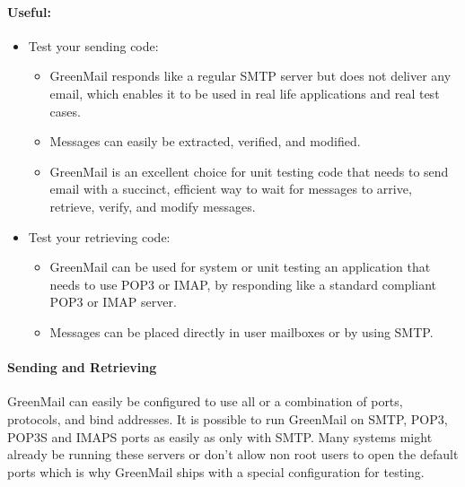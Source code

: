 \paragraph{Useful:}
\begin{itemize}
\item{}Test your sending code: 
\begin{itemize}
\item{}GreenMail responds like a regular SMTP server but does not deliver any email, which enables it to be used in real life applications and real test cases. 
\item{}Messages can easily be extracted, verified, and modified. 
\item{}GreenMail is an excellent choice for unit testing code that needs to send email with a succinct, efficient way to wait for messages to arrive, retrieve, verify, and modify messages. 
\end{itemize}
\item{}Test your retrieving code: 
\begin{itemize}
\item{}GreenMail can be used for system or unit testing an application that needs to use POP3 or IMAP, by responding like a standard compliant POP3 or IMAP server. 
\item{}Messages can be placed directly in user mailboxes or by using SMTP.
\end{itemize}
\end{itemize}

\paragraph{Sending and Retrieving}
GreenMail can easily be configured to use all or a combination of ports, protocols, and bind addresses. It  is possible to run GreenMail on SMTP, POP3, POP3S and IMAPS ports as easily as only with SMTP. Many systems might already be running these servers or don’t allow non root users to open the default ports which is why GreenMail ships with a special configuration for testing.